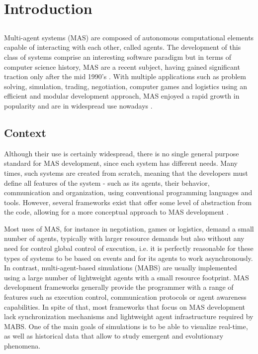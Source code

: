 \chapter{Introduction}
\label{chap:intro}

\section*{}

Multi-agent systems (MAS) are composed of autonomous computational elements capable of interacting with each other, called agents. The development of this class of systems comprise an interesting software paradigm but in terms of computer science history, MAS are a recent subject, having gained significant traction only after the mid 1990's \cite{wooldridge2008introduction}. With multiple applications such as problem solving, simulation, trading, negotiation, computer games and logistics using an efficient and modular development approach, MAS enjoyed a rapid growth in popularity and are in widespread use nowadays \cite{ferber1999multi}.

\section{Context}

Although their use is certainly widespread, there is no single general purpose standard for MAS development, since each system has different needs. Many times, such systems are created from scratch, meaning that the developers must define all features of the system - such as its agents, their behavior, communication and organization, using conventional programming languages and tools. However, several frameworks exist that offer some level of abstraction from the code, allowing for a more conceptual approach to
MAS development \cite{gormer2011jrep}. 

Most uses of MAS, for instance in negotiation, games or logistics, demand a small number of agents, typically with larger resource demands but also without any need for control global control of execution, i.e. it is perfectly reasonable for these types of systems to be based on events and for its agents to work asynchronously. In contrast, multi-agent-based simulations (MABS) are usually implemented using a large number of lightweight agents with a small resource footprint. MAS development frameworks generally provide the programmer with a range of features such as execution control, communication protocols or agent awareness capabilities. In spite of that, most frameworks that focus on MAS development lack synchronization mechanisms and lightweight agent infrastructure required by MABS. One of the main goals of simulations is to be able to visualize real-time, as well as historical data that allow to study emergent and evolutionary phenomena. \cite{mengistu2008scalability}


